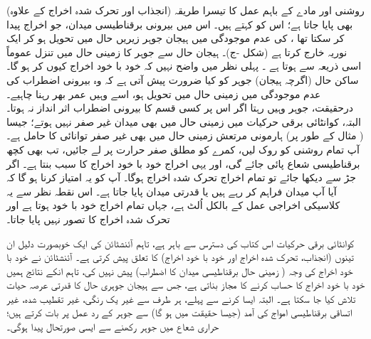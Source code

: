 (انجذاب اور تحرک شدہ  اخراج کے  علاوہ)  روشنی اور مادے کے  باہم عمل کا  تیسرا طریقہ بھی پایا جاتا ہے؛ اس کو   کہتے ہیں۔ اس میں  بیرونی برقناطیسی میدان،  جو اخراج پیدا کر سکتا تھا ،  کی عدم موجودگی میں ہیجان جوہر زیریں حال میں تحویل  ہو کر ایک نوریہ خارج کرتا ہے  (شکل -ج)۔ 	ہیجان حال سے   جوہر کا زمینی حال میں تنزل عموماً اسی ذریعہ  سے ہوتا ہے ۔ پہلی نظر میں  واضح  نہیں کہ خود با خود اخراج کیوں کر ہو گا۔  ساکن حال  (اگرچہ ہیجان)  جوہر کو کیا ضرورت پیش آتی ہے کہ وہ بیرونی اضطراب کی عدم موجودگی میں زمینی حال میں   تحویل  ہو، اسے وہیں عمر بھر رہنا چاہیے۔ درحقیقت،  جوہر وہیں رہتا اگر اس پر کسی قسم کا بیرونی اضطراب اثر انداز نہ ہوتا۔ البتہ،   کوانٹائی برقی حرکیات میں زمینی حال میں بھی میدان غیر صفر نہیں  ہوتے؛  جیسا ( مثال کے طور پر)   ہارمونی مرتعش زمینی حال میں بھی غیر صفر توانائی  کا حامل ہے۔ آپ تمام روشنی کو روک لیں،  کمرے  کو مطلق صفر حرارت پر لے جائیں، تب بھی کچھ  برقناطیسی شعاع پائی جائے گی، اور یہی   اخراج خود با خود اخراج کا سبب بنتا ہے۔ اگر جڑ سے دیکھا جائے تو  تمام اخراج تحرک شدہ اخراج ہوگا۔ آپ کو یہ امتیاز کرنا ہو گا کہ آیا آپ  میدان  فراہم کر رہے ہیں  یا قدرتی میدان پایا جاتا ہے۔ اس نقطہ نظر سے یہ کلاسیکی اخراجی عمل کے بالکل اُلٹ ہے، جہاں تمام اخراج خود با خود ہوتا ہے اور تحرک شدہ اخراج کا تصور نہیں پایا جاتا۔

کوانٹائی برقی حرکیات اس کتاب کی   دسترس  سے باہر ہے،   تاہم آئنشٹائن کی ایک خوبصورت دلیل ان تینوں (انجذاب،   تحرک شدہ اخراج اور خود با خود اخراج)  کا تعلق پیش کرتی ہے۔ آئنشٹائن نے خود با خود اخراج کی وجہ ( زمینی حال برقناطیسی میدان کا اضطراب)  پیش نہیں کی،  تاہم انکے نتائج ہمیں خود با خود اخراج کا حساب کرنے کا مجاز بناتی ہے، جس سے ہیجان جوہری حال کا  قدرتی عرصہ حیات تلاش کیا جا سکتا ہے۔ البتہ   ایسا کرنے سے پہلے، ہر طرف سے غیر یک رنگی، غیر تقطیب شدہ، غیر اتساقی  برقناطیسی امواج کی آمد  (جیسا حقیقت میں ہو گا) سے جوہر کے رد عمل پر بات کرتے ہیں؛  حراری شعاع میں جوہر رکھنے سے ایسی صورتحال پیدا ہوگی۔


